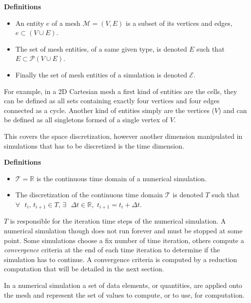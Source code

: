\noindent \textbf{Definitions}
\begin{itemize}
\item An entity $e$ of a mesh $\mathcal{M}=(V,E)$ is a subset of its vertices and edges, $e\subset (V\cup E)$. 
\item The set of mesh entities, of a same given type, is denoted $E$ such that $E\subset \mathcal{P}(V\cup E)$. 
\item Finally the set of mesh entities of a simulation is denoted $\mathcal{E}$.
\end{itemize}

For example, in a 2D Cartesian mesh a first kind of entities are the cells, they can be defined as all sets containing exactly four vertices and four edges connected as a cycle. Another kind of entities simply are the vertices ($V$) and can be defined as all singletons formed of a single vertex of $V$.

\medskip
This covers the space discretization, however another dimension manipulated in simulations that has to be discretized is the time dimension.

\noindent \textbf{Definitions}
\begin{itemize}
\item $\mathcal{T}=\mathbb{R}$ is the continuous time domain of a numerical simulation.
\item The discretization of the continuous time domain $\mathcal{T}$ is denoted $T$ such that $\forall\mbox{ }t_i\mbox{, }t_{i+1} \in T\mbox{, }\exists\mbox{ }\Delta t \in \mathbb{R}$\mbox{, }$t_{i+1} = t_i + \Delta t$.
\end{itemize}

$T$ is responsible for the iteration time steps of the numerical simulation. A numerical simulation though does not run forever and must be stopped at some point. Some simulations choose a fix number of time iteration, others compute a \emph{convergence} criteria at the end of each time iteration to determine if the simulation has to continue. A convergence criteria is computed by a reduction computation that will be detailed in the next section.

In a numerical simulation a set of data elements, or quantities, are applied onto the mesh and represent the set of values to compute, or to use, for computation.

